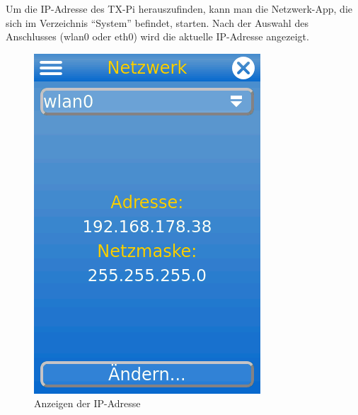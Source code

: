 \documentclass[
  paper=A4,
  ngerman,
  fontsize=12pt,
  parskip=half-,
]{scrbook}
\begin{document}
Um die IP-Adresse des TX-Pi herauszufinden, kann man die Netzwerk-App,
die sich im Verzeichnis "`System"' befindet, starten. Nach der Auswahl
des Anschlusses (wlan0 oder eth0) wird die aktuelle IP-Adresse angezeigt.

\begin{figure}[ht]
\centering
\includegraphics[scale=0.4]{images/ip-addr.png}
\caption{Anzeigen der IP-Adresse}
\end{figure}
\end{document}

